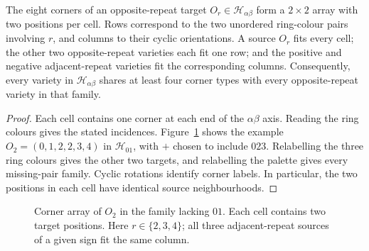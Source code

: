 \begin{lemma}\label{lem:fixed-missing-pair}
The eight corners of an opposite-repeat target $O_r\in\mathcal H_{\alpha\beta}$
form a $2\times2$ array with two positions per cell. Rows correspond to
the two unordered ring-colour pairs involving $r$, and columns to their
cyclic orientations. A source $O_r$ fits every cell; the other two
opposite-repeat varieties each fit one row; and the positive and negative
adjacent-repeat varieties fit the corresponding columns.
Consequently, every variety in $\mathcal H_{\alpha\beta}$ shares at least four
corner types with every opposite-repeat variety in that family.
\end{lemma}
\begin{proof}
Each cell contains one corner at each end of the $\alpha\beta$ axis.
Reading the ring colours gives the stated incidences. Figure~\ref{fig:ring-array}
shows the example $O_2=(0,1,2,2,3,4)$ in $\mathcal H_{01}$, with $+$
chosen to include $023$. Relabelling the three ring colours gives the
other two targets, and relabelling the palette gives every missing-pair
family. Cyclic rotations identify corner labels. In particular, the
two positions in each cell have identical source neighbourhoods.
\end{proof}

\begin{figure}[ht]
\centering
{}
\caption{Corner array of $O_2$ in the family lacking $01$.
Each cell contains two target positions. Here $r\in\{2,3,4\}$;
all three adjacent-repeat sources of a given sign fit the same column.}
\label{fig:ring-array}
\end{figure}

